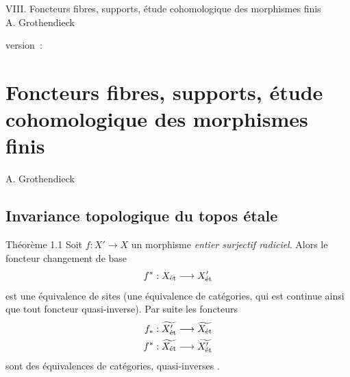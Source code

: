 \documentclass[10pt]{../fichiers-configuration-latex/smfart}
\begin{document}
\begin{center}
VIII. Foncteurs fibres, supports, étude cohomologique des morphismes finis\\
A. Grothendieck
\end{center}

version : \showgitstatus{}
\tableofcontents

\else
\chapter{Foncteurs fibres, supports, étude cohomologique des morphismes finis}
\begin{center}
A. Grothendieck
\end{center}
\fi

\setcounter{pageoriginal}{366}


\section{Invariance topologique du topos
  étale}

\begin{enonce*}{Théorème 1.1}
Soit \pageoriginale  $f : X'\to X$ un morphisme \emph{entier surjectif
radiciel}. Alors le foncteur changement de base
$$
f^{\ast} : X_{\text{\rm ét}} \to X'_{\text{\rm ét}}
$$
est une équivalence de sites (\ie une équivalence de catégories, qui
est continue ainsi que tout foncteur quasi-inverse). Par suite les
foncteurs
\begin{align*}
f_{\ast} : \widetilde{X'_{\text{\rm ét}}} &\to \widetilde{X_{\text{\rm ét}}}\\
f^{\ast} : \widetilde{X_{\text{\rm ét}}} &\to \widetilde{X'_{\text{\rm
      ét}}}
\end{align*}
sont des équivalences de catégories, quasi-inverses .
\end{enonce*}
\end{document}
